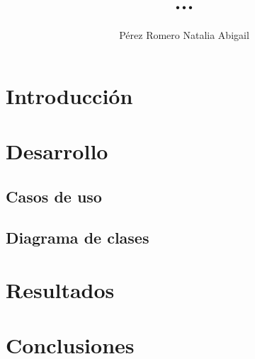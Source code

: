\documentclass[letterpaper,12pt,oneside]{book}
\author{Pérez Romero Natalia Abigail}
\title{ ...}
\begin{document}
\frontmatter
\maketitle


\mainmatter

\chapter{Introducción} %



\chapter{Desarrollo}

\section{Casos de uso}

\newpage


\newpage
\section{Diagrama de clases}


\chapter{Resultados}  %

\chapter{Conclusiones}  %


\end{document}
